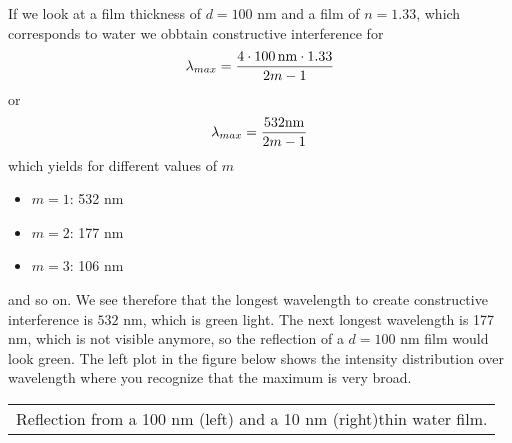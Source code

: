 \documentclass[letterpaper,10pt,english]{sphinxmanual}
\begin{document}

If we look at a film thickness of \(d=100\) nm and a film of \(n=1.33\), which corresponds to water we obbtain constructive interference for
\begin{equation*}
\begin{split}\lambda_{max}=\frac{4\cdot 100\, {\rm nm} \cdot 1.33}{2m-1}\end{split}
\end{equation*}
or
\begin{equation*}
\begin{split}\lambda_{max}=\frac{ 532 {\rm nm}}{2m-1}\end{split}
\end{equation*}
which yields for different values of \(m\)
\begin{itemize}
\item {} 
\(m=1\): 532 nm

\item {} 
\(m=2\): 177 nm

\item {} 
\(m=3\): 106 nm

\end{itemize}

and so on. We see therefore that the longest wavelength to create constructive interference is \(532\) nm, which is green light. The next longest wavelength is 177 nm, which is not visible anymore, so the reflection of a \(d=100\) nm film would look green. The left plot in the figure below shows the intensity distribution over wavelength where you recognize that the maximum is very broad.


\begin{savenotes}\sphinxattablestart
\centering
\begin{tabulary}{\linewidth}[t]{|T|}
\hline
\sphinxstyletheadfamily 
{} 
\\
\hline
{} Reflection from a 100 nm (left) and a 10 nm (right)thin water film.
\\
\hline
\end{tabulary}
\par
\sphinxattableend\end{savenotes}
\end{document}
